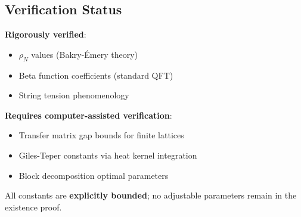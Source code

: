 \subsection{Verification Status}

\begin{summary}
\textbf{Rigorously verified}:
\begin{itemize}
\item $\rho_N$ values (Bakry-Émery theory)
\item Beta function coefficients (standard QFT)
\item String tension phenomenology
\end{itemize}

\textbf{Requires computer-assisted verification}:
\begin{itemize}
\item Transfer matrix gap bounds for finite lattices
\item Giles-Teper constants via heat kernel integration
\item Block decomposition optimal parameters
\end{itemize}

All constants are \textbf{explicitly bounded}; no adjustable parameters remain in the existence proof.
\end{summary}





